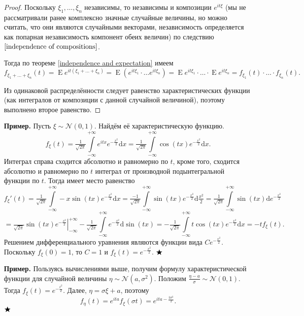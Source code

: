\documentclass[12pt]{article}
\numberwithin{theorem}{section}
\theoremstyle{definition}
\newenvironment{example}{\indent \textbf{Пример.}}{$ \hfill \bigstar $}
\newcommand{\expect}{\operatorname{E}}
\newcommand{\diff}{\mathrm{d}}
\begin{document}
	\begin{proof}
		Поскольку $ \xi_1, \ldots, \xi_n $ независимы, то независимы и композиции $ e^{it\xi} $ (мы не рассматривали ранее комплексно значные случайные величины, но можно считать, что они являются случайными векторами, независимость определяется как попарная независимость компонент обеих величин) по следствию $ \ref{independence of compositions} $.
		
		Тогда по теореме \ref{independence and expectation}
		имеем
		$$ f_{\xi_1 + \ldots + \xi_n}(t) = \expect e^{it(\xi_1 + \ldots + \xi_n)}
		= \expect (e^{it\xi_1} \cdot \ldots e^{it\xi_n})
		= \expect e^{it\xi_1} \cdot \ldots \cdot \expect e^{it\xi_n}
		= f_{\xi_1}(t) \cdot \ldots \cdot f_{\xi_n}(t). $$
		
		Из одинаковой распределённости следует равенство характеристических функции 
		(как интегралов от композиции с данной случайной величиной),
		поэтому выполнено второе равенство.
	\end{proof}
	
	\begin{example}
		Пусть $ \xi \sim \mathcal{N}(0, 1) $. Найдём её характеристическую функцию.
		$$ f_{\xi}(t)
		= \tfrac{1}{\sqrt{2\pi}} \int\limits_{-\infty}^{+\infty} e^{itx}e^{-\tfrac{x^2}{2}} \diff x
		= \tfrac{1}{\sqrt{2\pi}} \int\limits_{-\infty}^{+\infty} \cos(tx)e^{-\tfrac{x^2}{2}} \diff x. $$
		Интеграл справа сходится абсолютно и равномерно по $ t $,
		кроме того, сходится абсолютно и равномерно по $ t $ интеграл от производной
		подынтегральной функции по $ t $.
		Тогда имеет место равенство
		$$ f_{\xi}'(t) = \tfrac{1}{\sqrt{2\pi}} \int\limits_{-\infty}^{+\infty} -x\sin(tx)e^{-\tfrac{x^2}{2}} \diff x
		= \tfrac{-1}{\sqrt{2\pi}} \int\limits_{-\infty}^{+\infty} \sin(tx)e^{-\tfrac{x^2}{2}} \diff \tfrac{x^2}{2}
		= \tfrac{1}{\sqrt{2\pi}} \int\limits_{-\infty}^{+\infty} \sin(tx) \diff e^{-\tfrac{x^2}{2}} $$ 
		$$ = \left.\tfrac{}{\sqrt{2\pi}}\sin(tx)e^{-\tfrac{x^2}{2}}\right|_{-\infty}^{+\infty}
		- \tfrac{1}{\sqrt{2\pi}} \int\limits_{-\infty}^{+\infty} e^{-\tfrac{x^2}{2}} \diff \sin(tx)
		= - \tfrac{1}{\sqrt{2\pi}} \int\limits_{-\infty}^{+\infty} t\cos(tx)e^{-\tfrac{x^2}{2}} \diff x
		= -t f_\xi(t). $$
		Решением дифференциального уравнения являются функции вида $ Ce^{-\tfrac{x^2}{2}} $.
		Поскольку $ f_{\xi}(0) = 1 $, то $ C = 1 $ и $ f_{\xi}(t) = e^{-\tfrac{x^2}{2}} $.
	\end{example}
	
	\begin{example}
		Пользуясь вычислениями выше, получим формулу характеристической функции для случайной величины 
		$ \eta \sim \mathcal{N}(a, \sigma^2) $.
		Положим $ \tfrac{\eta - a}{\sigma} \sim \mathcal{N}(0, 1) $.
		Тогда $ f_{\xi}(t) = e^{-\tfrac{t^2}{2}} $.
		Далее, $ \eta = \sigma\xi + a $, поэтому 
		$$ f_{\eta}(t) = e^{ita} f_{\xi}(\sigma t) = e^{ita - \tfrac{t\sigma^2}{2}}. $$
	\end{example}
	
\end{document}
